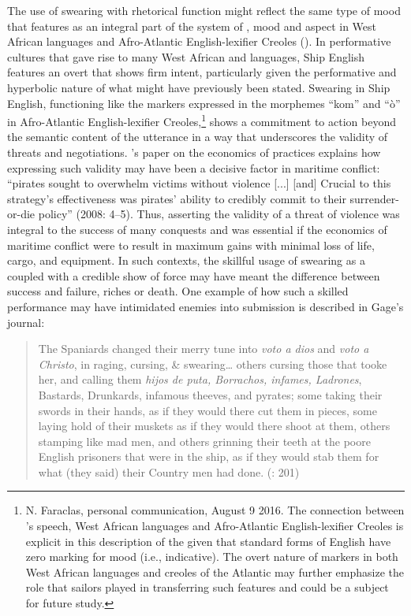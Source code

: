 The use of swearing with rhetorical function might reflect the same type of  mood that features as an integral part of the system of , mood and aspect in West African languages and Afro-Atlantic English-lexifier Creoles (\citealt{FaraclasEtAl2016}). In performative cultures that gave rise to many West African and  languages, Ship English features an overt  that shows firm intent, particularly given the performative and hyperbolic nature of what might have previously been stated. Swearing in Ship English, functioning like the  markers expressed in the morphemes “kom” and “ò” in Afro-Atlantic English-lexifier Creoles,\footnote{N. Faraclas, 
  personal communication, August 9 2016. The connection between ’s speech, West African languages and Afro-Atlantic English-lexifier Creoles is explicit in this description of the  given that standard forms of English have zero marking for  mood (i.e., indicative). The overt nature of  markers in both West African languages and creoles of the Atlantic may further emphasize the role that sailors played in transferring such features and could be a subject for future study.} 
shows a commitment to action beyond the semantic content of the utterance in a way that underscores the validity of threats and negotiations. \citet{Leeson2008}’s paper on the economics of  practices explains how expressing such validity may have been a decisive factor in maritime conflict: “pirates sought to overwhelm victims without violence [...] [and] Crucial to this strategy’s effectiveness was pirates’ ability to credibly commit to their surrender-or-die policy” (2008: 4–5). Thus, asserting the validity of a threat of violence was integral to the success of many  conquests and was essential if the economics of maritime conflict were to result in maximum gains with minimal loss of life, cargo, and equipment. In such contexts, the skillful usage of swearing as a  coupled with a credible show of force may have meant the difference between success and failure, riches or death. One example of how such a skilled performance may have intimidated enemies into submission is described in Gage’s journal:

\begin{quotation}
The Spaniards changed their merry tune into \textit{voto a dios} and \textit{voto a Christo}, in raging, cursing, \& swearing… others cursing those that tooke her, and calling them \textit{hijos de puta, Borrachos, infames, Ladrones}, Bastards, Drunkards, infamous theeves, and pyrates; some taking their swords in their hands, as if they would there cut them in pieces, some laying hold of their muskets as if they would there shoot at them, others stamping like mad men, and others grinning their teeth at the poore English prisoners that were in the ship, as if they would stab them for what (they said) their Country men had done. (\citealt{Gage1648}: 201)
\end{quotation}

